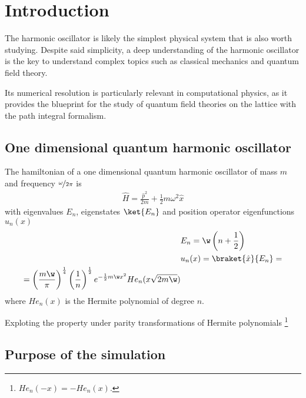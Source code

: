 \section{Introduction}%
\label{sec:Introduction}
The harmonic oscillator is likely the simplest physical system that is also worth studying. Despite said simplicity, a deep understanding of the harmonic oscillator is the key to understand complex topics such  as classical mechanics and quantum field theory.

Its numerical resolution is particularly relevant in computational physics, as it provides the blueprint for the study of quantum field theories on the lattice with the path integral formalism.


\subsection{One dimensional quantum harmonic oscillator}%
\label{subsec:1DQHO}
The hamiltonian of a one dimensional quantum harmonic oscillator of mass $m$ and frequency $\nicefrac{\omega}{2\pi}$ is
\begin{align}
  \label{eqn:1}
  \hat{H}= \frac{\hat{p}^{2}}{2m} + \frac{1}{2}m\omega  ^2 \hat{x}
\end{align}
with eigenvalues $E_{n}$, eigenstates $\ket{E_{n}}$ and position operator eigenfunctions $u_{n}(x)$
\begin{align}
  \label{eqn:2}
  &E_{n}=\w \left(n+\frac{1}{2}\right) \\
  &u_{n}(x) = \braket{\hat{x}}{E_{n}} = \notag \\
    = \left(\frac{m\w}{\pi}\right)^{\frac{1}{4}}\left(\frac{1}{n}\right)^{\frac{1}{2}}
              e ^{-\frac{1}{2}m\w x ^2} He_{n}(x \sqrt{2m\w})
\end{align}
where $He_{n}(x)$ is the Hermite polynomial of degree $n$.

Exploting the property under parity transformations of Hermite polynomials \footnote{$He_{n}(-x) = - He_{n}(x)$.}



\subsection{Purpose of the simulation}%
\label{subsec:purpose}

